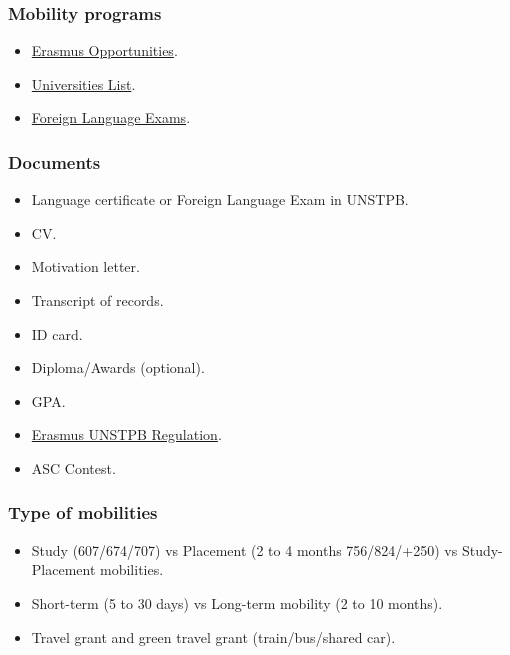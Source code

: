 \begin{frame}
\frametitle{Mobility programs}
\begin{itemize}
    \item \href{https://acs.pub.ro/parteneriate/relatii-internationale/acorduri-erasmus/}{Erasmus Opportunities}.
    \item \href{https://acs.pub.ro/public/21-27-Mobilitate-Studiu-Eplus-UNIVERSITATI-PARTENERE-septembrie-2024.pdf}{Universities List}.
    \item \href{https://upb.ro/concurs-granturi-erasmus/}{Foreign Language Exams}.
\end{itemize}
\end{frame}

\begin{frame}
\frametitle{Documents}
\begin{itemize}
    \item Language certificate or Foreign Language Exam in UNSTPB.
    \item CV.
    \item Motivation letter.
    \item Transcript of records.
    \item ID card.
    \item Diploma/Awards (optional).
    \item GPA.
    \item \href{https://acs.pub.ro/public/Regulament_Mobilitati_ERASMUS_2024.pdf}{Erasmus UNSTPB Regulation}.
    \item ASC Contest.
\end{itemize}
\end{frame}

\begin{frame}
\frametitle{Type of mobilities}
\begin{itemize}
    \item Study (607/674/707) vs Placement (2 to 4 months 756/824/+250) vs Study-Placement mobilities.
    \item Short-term (5 to 30 days) vs Long-term mobility (2 to 10 months).
    \item Travel grant and green travel grant (train/bus/shared car).
\end{itemize}
\end{frame}

